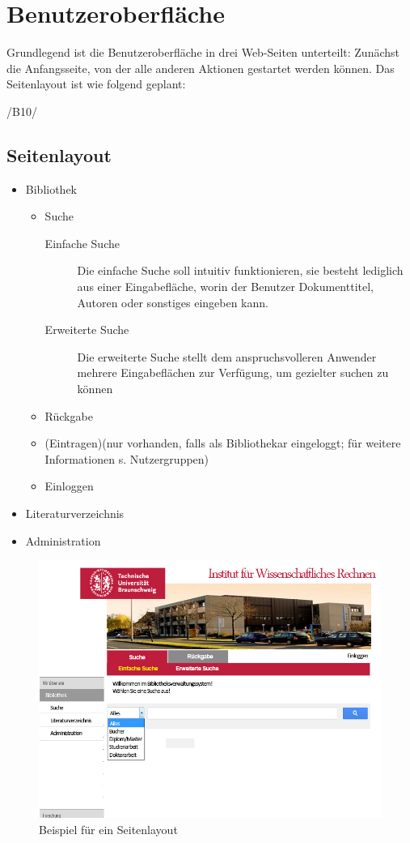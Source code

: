 \chapter{Benutzeroberfläche}

Grundlegend ist die Benutzeroberfläche in drei Web-Seiten unterteilt:
Zunächst die Anfangsseite, von der alle anderen Aktionen gestartet werden können.
Das Seitenlayout ist wie folgend geplant:

/B10/
\section{Seitenlayout}

 \begin{itemize}
   \item Bibliothek
   \begin{itemize}
    \item Suche
      \begin{description}
       \item[Einfache Suche] Die einfache Suche soll intuitiv funktionieren, sie besteht lediglich aus einer Eingabefläche, worin der Benutzer
       Dokumenttitel, Autoren oder sonstiges eingeben kann. 
       \item[Erweiterte Suche] Die erweiterte Suche stellt dem anspruchsvolleren Anwender mehrere Eingabeflächen zur Verfügung, um gezielter suchen zu     	   können 
       \end{description}
      \item Rückgabe
      \item (Eintragen)(nur vorhanden, falls als Bibliothekar eingeloggt; für weitere Informationen s. Nutzergruppen)
      \item Einloggen
    \end{itemize}
    \item Literaturverzeichnis
    \item Administration
 \end{itemize}
 
\begin{figure}
\includegraphics[width=0.8\linewidth]{bilder/layout2.jpg}
\caption{Beispiel für ein Seitenlayout}
\end{figure}

